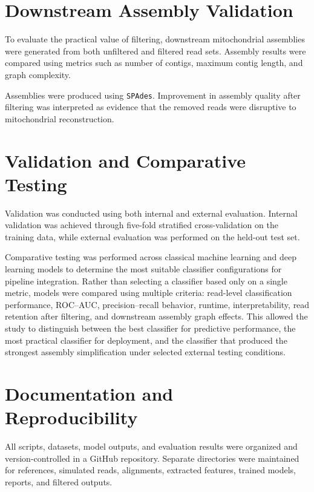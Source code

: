 \section{Downstream Assembly Validation}

To evaluate the practical value of filtering, downstream mitochondrial assemblies were generated from both unfiltered and filtered read sets. Assembly results were compared using metrics such as number of contigs, maximum contig length, and graph complexity.

Assemblies were produced using \texttt{SPAdes}. Improvement in assembly quality after filtering was interpreted as evidence that the removed reads were disruptive to mitochondrial reconstruction.

\section{Validation and Comparative Testing}

Validation was conducted using both internal and external evaluation. Internal validation was achieved through five-fold stratified cross-validation on the training data, while external evaluation was performed on the held-out test set.

Comparative testing was performed across classical machine learning and deep learning models to determine the most suitable classifier configurations for pipeline integration. Rather than selecting a classifier based only on a single metric, models were compared using multiple criteria: read-level classification performance, ROC--AUC, precision--recall behavior, runtime, interpretability, read retention after filtering, and downstream assembly graph effects. This allowed the study to distinguish between the best classifier for predictive performance, the most practical classifier for deployment, and the classifier that produced the strongest assembly simplification under selected external testing conditions.

\section{Documentation and Reproducibility}

All scripts, datasets, model outputs, and evaluation results were organized and version-controlled in a GitHub repository. Separate directories were maintained for references, simulated reads, alignments, extracted features, trained models, reports, and filtered outputs.

